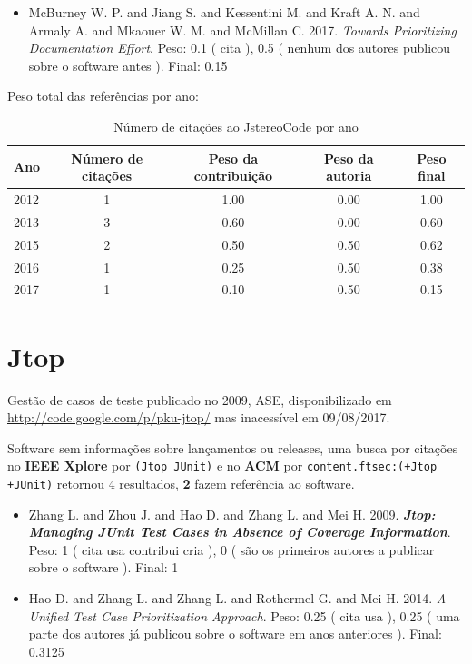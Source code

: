 \begin{itemize}
\item McBurney W. P. and Jiang S. and Kessentini M. and Kraft A. N. and Armaly A. and Mkaouer W. M. and McMillan C.
      2017.
        \textit{ Towards Prioritizing Documentation Effort}.
      Peso:
      0.1 (
          cita
      ),
      0.5 (
nenhum dos autores publicou sobre o software antes
      ).
      Final:
      0.15

\end{itemize}

Peso total das referências por ano:

\begin{table}[h]
\caption{Número de citações ao JstereoCode por ano}
\centering
\begin{tabular}{| l | c | c | c | c |}
  \hline
  Ano & Número de citações & Peso da contribuição & Peso da autoria & Peso final \\
  \hline
  2012
    & 1
    & 1.00
    & 0.00
    & 1.00 \\
  2013
    & 3
    & 0.60
    & 0.00
    & 0.60 \\
  2015
    & 2
    & 0.50
    & 0.50
    & 0.62 \\
  2016
    & 1
    & 0.25
    & 0.50
    & 0.38 \\
  2017
    & 1
    & 0.10
    & 0.50
    & 0.15 \\
  \hline
\end{tabular}
\end{table}


\section{Jtop}

Gestão de casos de teste
publicado no 2009, ASE,
disponibilizado em \url{http://code.google.com/p/pku-jtop/}
mas inacessível em 09/08/2017.

Software sem informações sobre lançamentos ou releases,
uma busca por citações no {\bf IEEE Xplore} por
\texttt{(Jtop JUnit)}
e no {\bf ACM} por
\texttt{content.ftsec:(+Jtop +JUnit)}
retornou
4 resultados,
{\bf 2} fazem referência ao software.

\begin{itemize}
\item Zhang L. and Zhou J. and Hao D. and Zhang L. and Mei H.
      2009.
        \textbf{\textit{ Jtop: Managing JUnit Test Cases in Absence of Coverage Information}}.
      Peso:
      1 (
          cita
          usa
          contribui
          cria
      ),
      0 (
são os primeiros autores a publicar sobre o software
      ).
      Final:
      1

\item Hao D. and Zhang L. and Zhang L. and Rothermel G. and Mei H.
      2014.
        \textit{ A Unified Test Case Prioritization Approach}.
      Peso:
      0.25 (
          cita
          usa
      ),
      0.25 (
uma parte dos autores já publicou sobre o software em anos anteriores
      ).
      Final:
      0.3125

\end{itemize}

